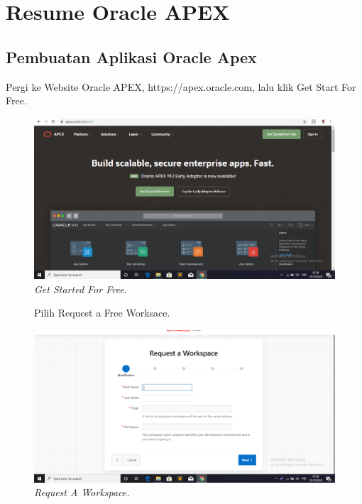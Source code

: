 \chapter*{Resume Oracle APEX}
\section*{Pembuatan Aplikasi Oracle Apex}
\begin{enumerate}

\item[1]Pergi ke Website Oracle APEX, https://apex.oracle.com, lalu klik Get Start For Free.

\begin{figure}[!htbp]
    \begin{center}
    \includegraphics[scale=0.2]{apex/apex1.png}
    \caption{\textit{Get Started For Free.}}
    \end{center}   
    \end{figure}
    
\begin{figure}[!htbp]
\item[2]Pilih Request a Free Worksace.

    \begin{center}
    \includegraphics[scale=0.2]{apex/apex2.png}
    \caption{\textit{Request A Workspace.}}
    \end{center}


\end{figure}
\end{enumerate}
